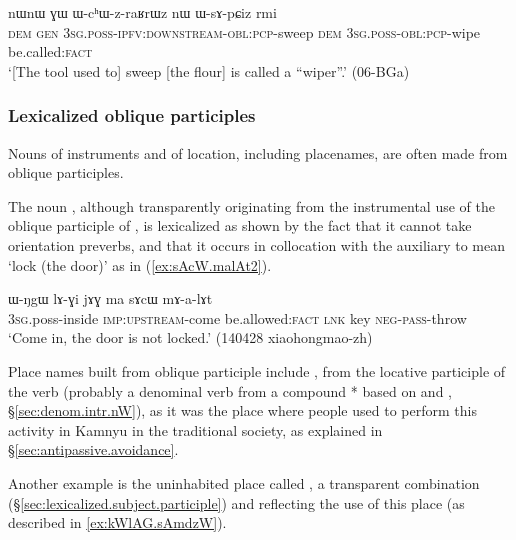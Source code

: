 \begin{exe}
\ex \label{ex:WchWzraRWz}
\gll  nɯnɯ ɣɯ ɯ-cʰɯ-z-raʁrɯz nɯ ɯ-sɤ-pɕiz rmi \\ 
\textsc{dem} \textsc{gen} \textsc{3sg}.\textsc{poss}-\textsc{ipfv}:\textsc{downstream}-\textsc{obl}:\textsc{pcp}-sweep \textsc{dem}  \textsc{3sg}.\textsc{poss}-\textsc{obl}:\textsc{pcp}-wipe be.called:\textsc{fact} \\
\glt `[The tool used to] sweep [the flour] is called a ``wiper''.' (06-BGa) 	
\end{exe}

\subsubsection{Lexicalized oblique participles} \label{sec:lexicalized.oblique.participle}
Nouns of instruments and of location, including placenames, are often made from oblique participles. 

The noun , although transparently originating from the instrumental use of the oblique participle of , is lexicalized as shown by the fact that it cannot take orientation preverbs, and that it occurs in collocation with the auxiliary  to mean `lock (the door)' as in (\ref{ex:sAcW.malAt2}).

\begin{exe}
\ex \label{ex:sAcW.malAt2}
\gll   ɯ-ŋgɯ lɤ-ɣi jɤɣ ma sɤcɯ mɤ-a-lɤt \\
\textsc{3sg}.poss-inside \textsc{imp}:\textsc{upstream}-come be.allowed:\textsc{fact} \textsc{lnk} key \textsc{neg}-\textsc{pass}-throw \\
\glt `Come in, the door is not locked.' (140428  xiaohongmao-zh) 
\end{exe}

Place names built from oblique participle include , from the locative participle  of the verb  (probably a denominal verb from a compound * based on  and , §\ref{sec:denom.intr.nW}), as it was the place where people used to perform this activity in Kamnyu in the traditional society, as explained in §\ref{sec:antipassive.avoidance}.
 
Another example is the uninhabited place called , a transparent combination   (§\ref{sec:lexicalized.subject.participle}) and  reflecting the use of this place (as described in \ref{ex:kWlAG.sAmdzW}).

